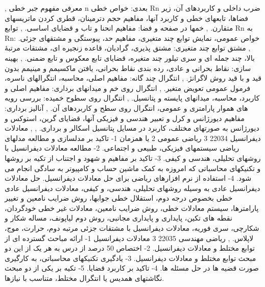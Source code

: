 \documentclass[class=article, crop=false]{standalone}
\begin{document}
{{{{            ,
            معرفی مفهوم جبر خطی n بعدی: خواص خطی Rn ضرب داخلی و کاربردهای آن، زیر فضاها، تابعهای خطی و کاربرد آنها، مفاهیم حجم دترمینان، قطری کردن ماتریسهای متقارن.
            ,
            خمها در صفحه و فضا: مفاهیم انحنا و تاب و قضایای اساسی.
            ,
            توابع Rn به Rn: خواص عمومی، نمایش توابع چند متغیری، مفاهیم حد، پیوستگی و مشتقهای جزئی.
            ,
            مشتق توابع چند متغیری: مشتق پذیری، گرادیان، قاعده زنجیره ای، مشتقات مرتبهٔ بالا، چند جمله ای و سری تیلور چند متغیره، قضایای تابع معکوس و تابع ضمنی.
            ,
            بهینه سازی: نقاط بحرانی و عادی، رده بندی نقاط بحرانی، یافتن ماکسیمم و مینیمم بدون قید و با قید روش لاگرانژ.
            ,
            انتگرال چند گانه: مفاهیم اصلی، محاسبه، انتگرالهای ناسره، فرمول عمومی تعویض متغیر.
            ,
            انتگرال روی خم و میدانهای برداری: مفاهیم اصلی و کاربرد، محاسبه، میدانهای پایسته و پتانسیل.
            ,
            انتگرال روی سطوح خمیده: بررسی رویه های هموار پارامتری و عمومی، انتگرال روی سطح و کاربردهای آن.
            ,
            آنالیز برداری: مفاهیم دیورژانس و کرل و تعبیر هندسی و فیزیکی آنها، قضایای گرین، استوکس و دیورژانس به صورتهای مختلف، کاربرد در مسایل پتانسیل اسکالر و برداری.
            ,
        }}
        },{{
            معادلات دیفرانسیل
        }{
            22034
        }{
            3
        }{
            ریاضی عمومی 2 یا همزمان
        }{{
            1- تاکید بر مدلسازی و مطالعه مدلهای ریاضی سیستمهای فیزیکی، طبیعی و اجتماعی. 2- مطالعه معادلات دیفرانسیل با روشهای تحلیلی، هندسی و کیفی. 3- تاکید بر مفاهیم و شهود و اجتناب از تکیه بر روشها و تکنیکهای محاسباتی که امروزه به کمک ماشین حساب و کامپیوتر به سادگی انجام می شود. 4- استفاده از نرم افزارهای ریاضی برای حل معادلات دیفرانسیل.
        }}{{
            حل معادلات دیفرانسیل عادی به وسیله روشهای تحلیلی، هندسی، و کیفی، معادلات دیفرانسیل عادی خطی بخصوص درجه دوم، استقلال خطی جوابها، روش ضرایب نامعین و تغییر پارامترها، سیستم معادلات خطی، روش ضرایب نامعین، معادلات غیر خطی خودگردان، نقطه های تکین، پایداری و پایداری مجانبی، روش دوم لیاپونف، مساله شکار و شکارچی، سری فوریه، معادلات دیفرانسیل با مشتقات جزئی مرتبه دوم، حرارت، موج، لاپلاس.
        }}
        },{{
            ریاضی مهندسی
        }{
            22035
        }{
            3
        }{
            معادلات دیفرانسیل
        }{{
            1- ارائه مباحث گسترده ای از توابع مختلط و معادلات دیفرانسیل. 2- اختصاص 50 درصد از درس به هر یک از این دو مبحث توابع مختلط و معادلات دیفرانسیل.
            3- یادگیری تکنیکهای محاسباتی، به کارگیری صورت قضیه ها در حل مسئله ها. 4- تاکید بر کاربرد قضایا. 5- تکیه بر یکی از دو مبحث نگاشتهای همدیس یا انتگرال مختلط، متناسب با نیازها.
}}}}
\end{document}
